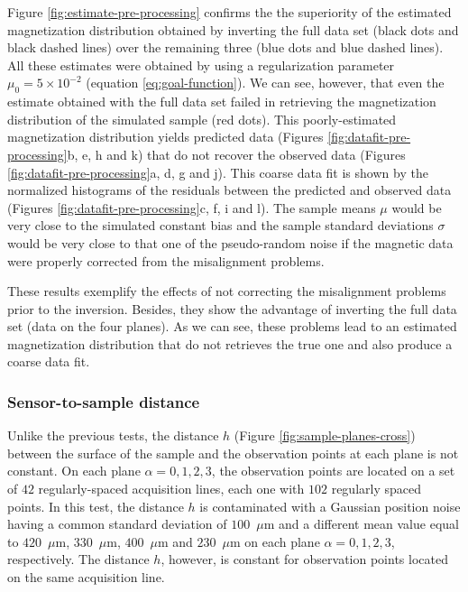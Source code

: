 \documentclass[draft,gc]{agutex}
\begin{document}
\begin{article}
Figure \ref{fig:estimate-pre-processing} confirms the
the superiority of the estimated magnetization distribution 
obtained by inverting the full data set (black dots and 
black dashed lines) over the remaining three (blue dots and blue dashed lines).
All these estimates were obtained by using a regularization
parameter $\mu_{0} = 5 \times 10^{-2}$ (equation \ref{eq:goal-function}).
We can see, however, that even the estimate obtained with
the full data set failed in
retrieving the magnetization distribution of the simulated sample
(red dots). 
This poorly-estimated magnetization distribution yields 
predicted data (Figures \ref{fig:datafit-pre-processing}b, e, h and k) 
that do not
recover the observed data (Figures \ref{fig:datafit-pre-processing}a, 
d, g and j).
This coarse data fit is shown by the normalized histograms of 
the residuals between the predicted and
observed data (Figures \ref{fig:datafit-pre-processing}c, f, i and l).
The sample means $\mu$ would be very close to the simulated 
constant bias and the sample standard deviations $\sigma$ would
be very close to that one of the pseudo-random noise 
if the magnetic data were properly corrected from
the misalignment problems.

These results exemplify the effects of not correcting the
misalignment problems prior to the inversion.
Besides, they show the advantage of inverting the full data set 
(data on the four planes).
As we can see, these problems lead to an estimated magnetization 
distribution that do not retrieves the true one and also
produce a coarse data fit.

\subsubsection{Sensor-to-sample distance}

Unlike the previous tests, the distance $h$ 
(Figure \ref{fig:sample-planes-cross}) between the 
surface of the sample and the observation
points at each plane is not constant.
On each plane $\alpha = 0, 1, 2, 3$,
the observation points are located on a set 
of $42$ regularly-spaced acquisition 
lines, each one with $102$ regularly spaced points.
In this test, the distance $h$ is contaminated with a
Gaussian position noise having a common standard deviation of
$100$~$\mu$m and a different mean value equal to 
$420$~$\mu$m, $330$~$\mu$m, $400$~$\mu$m and $230$~$\mu$m
on each plane $\alpha = 0, 1, 2, 3$, respectively.
The distance $h$, however, is constant for observation points 
located on the same acquisition line.


\end{article}
\end{document}
